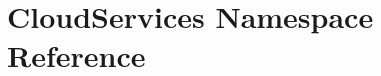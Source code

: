 \hypertarget{namespaceCloudServices}{\section{Cloud\-Services Namespace Reference}
\label{namespaceCloudServices}
}
